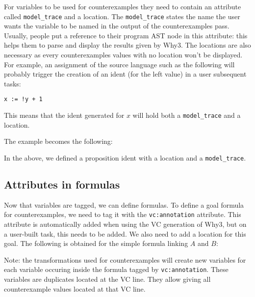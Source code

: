 For variables to be used for counterexamples they need to contain an attribute
called \verb|model_trace| and a location. The \verb|model_trace| states the
name the user wants the variable to be named in the output of the
counterexamples pass. Usually, people put a reference to their program AST node
in this attribute: this helps them to parse and display the results given by
Why3.
The locations are also necessary as every counterexamples values with no
location won't be displayed. For example, an assignment of the source language
such as the following will probably trigger the creation of an ident (for the
left value) in a user subsequent tasks:
\begin{lstlisting}
x := !y + 1
\end{lstlisting}
This means that the ident generated for $x$ will hold both a \verb|model_trace|
and a location.

The example becomes the following:

In the above, we defined a proposition ident with a location and a
\verb|model_trace|.

\subsection{Attributes in formulas}

Now that variables are tagged, we can define formulas. To define a goal formula
for counterexamples, we need to tag it with the \verb|vc:annotation|
attribute. This attribute is automatically added when using the VC generation
of Why3, but on a user-built task, this needs to be added. We also need to add
a location for this goal.
The following is obtained for the simple formula linking $A$ and $B$:


Note: the transformations used for counterexamples will create new variables
for each variable occuring inside the formula tagged by
\verb|vc:annotation|. These variables are duplicates located at the VC
line. They allow giving all counterexample values located at that VC line.



% 


